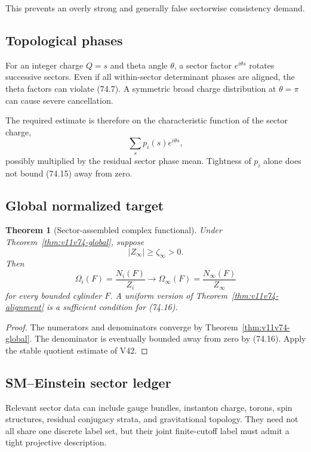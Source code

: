 \documentclass[11pt]{article}
\newtheorem{theorem}{Theorem}[section]
\begin{document}
This prevents an overly strong and generally false sectorwise
consistency demand.

\subsection{Topological phases}

For an integer charge \(Q=s\) and theta angle \(\theta\), a sector
factor \(e^{i\theta s}\) rotates successive sectors.  Even if all
within-sector determinant phases are aligned, the theta factors can
violate (74.7).  A symmetric broad charge distribution at
\(\theta=\pi\) can cause severe cancellation.

The required estimate is therefore on the characteristic function of
the sector charge,
\[
                              \sum_sp_i(s)e^{i\theta s},       \tag{74.15}
\]
possibly multiplied by the residual sector phase mean.  Tightness of
\(p_i\) alone does not bound (74.15) away from zero.

\subsection{Global normalized target}

\begin{theorem}[Sector-assembled complex functional]
\label{thm:v11v74-functional}
Under Theorem~\ref{thm:v11v74-global}, suppose
\[
                              |Z_\infty|\ge\zeta_\infty>0.    \tag{74.16}
\]
Then
\[
                              \Omega_i(F)=\frac{N_i(F)}{Z_i}
                  \longrightarrow
                              \Omega_\infty(F)
                              =\frac{N_\infty(F)}{Z_\infty}   \tag{74.17}
\]
for every bounded cylinder \(F\).  A uniform version of
Theorem~\ref{thm:v11v74-alignment} is a sufficient condition for
(74.16).
\end{theorem}

\begin{proof}
The numerators and denominators converge by
Theorem~\ref{thm:v11v74-global}.  The denominator is eventually bounded
away from zero by (74.16).  Apply the stable quotient estimate of V42.
\end{proof}

\subsection{SM--Einstein sector ledger}

Relevant sector data can include gauge bundles, instanton charge,
torons, spin structures, residual conjugacy strata, and gravitational
topology.  They need not all share one discrete label set, but their
joint finite-cutoff label must admit a tight projective description.
\end{document}
